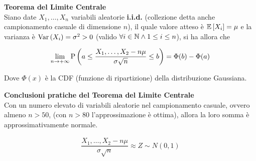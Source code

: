 \begin{defn}
    \textbf{Teorema del Limite Centrale} \\

    Siano date $X_1, \hdots, X_n$ variabili aleatorie \textbf{i.i.d.} (collezione
    detta anche campionamento casuale di dimensione $n$), il quale valore atteso
    è $\mathbb{E}\left[X_i\right] = \mu$ e la varianza è $\text{Var}\left(X_i\right) = \sigma^2 > 0$ (valido
    $\forall i \in \mathbb{N} \land 1 \leq i \leq n $), si ha allora che

    \begin{equation}
        \begin{aligned}
            \lim_{n \to +\infty} \text{P}\left(a \leq \dfrac{X_1, \hdots, X_2 - n\mu }{\sigma \sqrt{n}} \leq b\right) = \Phi(b) - \Phi(a)
        \end{aligned}
    \end{equation}

    Dove $\Phi(x)$ è la CDF (funzione di ripartizione) della distribuzione Gaussiana.
\end{defn}

\begin{defn}
    \textbf{Conclusioni pratiche del Teorema del Limite Centrale} \\
    Con un numero elevato di variabili aleatorie nel campionamento casuale,
    ovvero almeno $n > 50$, (con $n > 80 $ l'approssimazione è ottima), allora
    la loro somma è approssimativamente normale.

    \begin{equation*}
        \begin{aligned}
            \dfrac{X_1, \hdots, X_2 - n\mu }{\sigma \sqrt{n}}  \approx Z \sim N(0, 1)
        \end{aligned}
    \end{equation*}
\end{defn}

